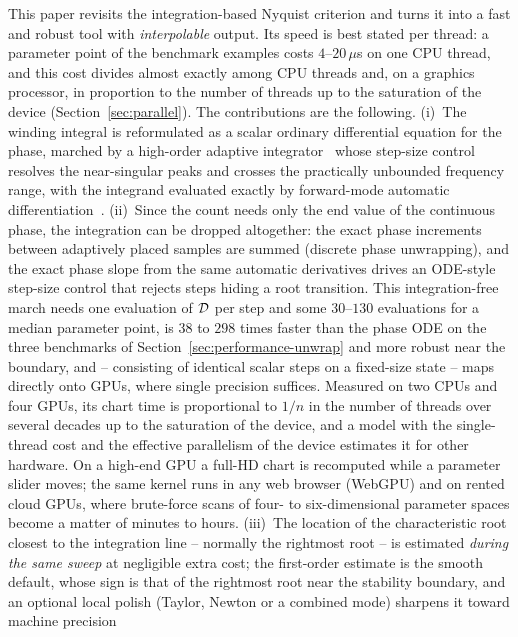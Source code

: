 This paper revisits the integration-based Nyquist criterion and turns it into
a fast and robust tool with \emph{interpolable} output. Its speed is best
stated per thread: a parameter point of the benchmark examples costs
$4$--$20\,\mu$s on one CPU thread, and this cost divides almost exactly among
CPU threads and, on a graphics processor, in proportion to the number of
threads up to the saturation of the device (Section~\ref{sec:parallel}). The
contributions are the following. (i)~The winding integral is reformulated as a scalar ordinary
differential equation for the phase, marched by a high-order adaptive
integrator~\cite{verner2010numerically,tsitouras2011runge,rackauckas2017differentialequations}
whose step-size control resolves the near-singular peaks and crosses the
practically unbounded frequency range, with the integrand evaluated exactly
by forward-mode automatic differentiation~\cite{revels2016forward}.
(ii)~Since the count needs only the end value of the continuous phase, the
integration can be dropped altogether: the exact phase increments between
adaptively placed samples are summed (discrete phase unwrapping), and the
exact phase slope from the same automatic derivatives drives an
ODE-style step-size control that rejects steps hiding a root transition.
This integration-free march needs one evaluation of $\mathcal{D}$ per step and
some $30$--$130$ evaluations for a median parameter point, is $38$ to $298$
times faster than the phase ODE on the three benchmarks of
Section~\ref{sec:performance-unwrap} and more robust near the boundary, and
-- consisting of identical scalar steps on a fixed-size state -- maps
directly onto GPUs, where single precision suffices. Measured on two CPUs and
four GPUs, its chart time is proportional to $1/n$ in the number of threads
over several decades up to the saturation of the device, and a model with the
single-thread cost and the effective parallelism of the device estimates it
for other hardware. On a high-end GPU a full-HD chart is recomputed while a
parameter slider moves; the same kernel runs in any web browser (WebGPU) and on
rented cloud GPUs, where brute-force scans of four- to six-dimensional
parameter spaces become a matter of minutes to hours.
(iii)~The location of the
characteristic root closest to the integration line -- normally the rightmost
root -- is estimated \emph{during the same sweep} at negligible extra cost; the
first-order estimate is the smooth default, whose sign is that of the
rightmost root near the stability boundary, and an optional local
polish (Taylor, Newton or a combined mode) sharpens it toward machine precision
